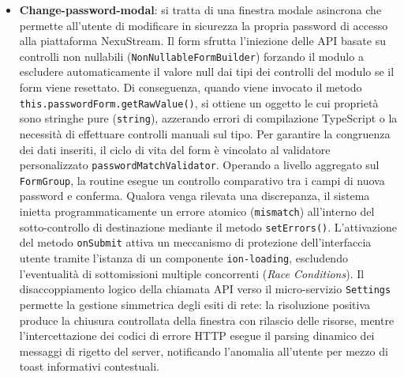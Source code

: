 \documentclass[11pt,a4paper]{article}
\begin{document}
\begin{itemize}
    \item \textbf{Change-password-modal}: si tratta di una finestra modale asincrona che permette all'utente di modificare in sicurezza la propria password di accesso alla piattaforma NexuStream. Il form sfrutta l'iniezione delle API basate su controlli non nullabili (\texttt{NonNullableFormBuilder}) forzando il modulo a escludere automaticamente il valore null dai tipi dei controlli del modulo se il form viene resettato. Di conseguenza, quando viene invocato il metodo \texttt{this.passwordForm.getRawValue()}, si ottiene un oggetto le cui proprietà sono stringhe pure (\texttt{string}), azzerando errori di compilazione TypeScript o la necessità di effettuare controlli manuali sul tipo. Per garantire la congruenza dei dati inseriti, il ciclo di vita del form è vincolato al validatore personalizzato \texttt{passwordMatchValidator}. Operando a livello aggregato sul \texttt{FormGroup}, la routine esegue un controllo comparativo tra i campi di nuova password e conferma. Qualora venga rilevata una discrepanza, il sistema inietta programmaticamente un errore atomico (\texttt{mismatch}) all'interno del sotto-controllo di destinazione mediante il metodo \texttt{setErrors()}. L'attivazione del metodo \texttt{onSubmit} attiva un meccanismo di protezione dell'interfaccia utente tramite l'istanza di un componente \texttt{ion-loading}, escludendo l'eventualità di sottomissioni multiple concorrenti (\textit{Race Conditions}). Il disaccoppiamento logico della chiamata API verso il micro-servizio \texttt{Settings} permette la gestione simmetrica degli esiti di rete: la risoluzione positiva produce la chiusura controllata della finestra con rilascio delle risorse, mentre l'intercettazione dei codici di errore HTTP esegue il parsing dinamico dei messaggi di rigetto del server, notificando l'anomalia all'utente per mezzo di toast informativi contestuali.

\end{itemize}
\end{document}
